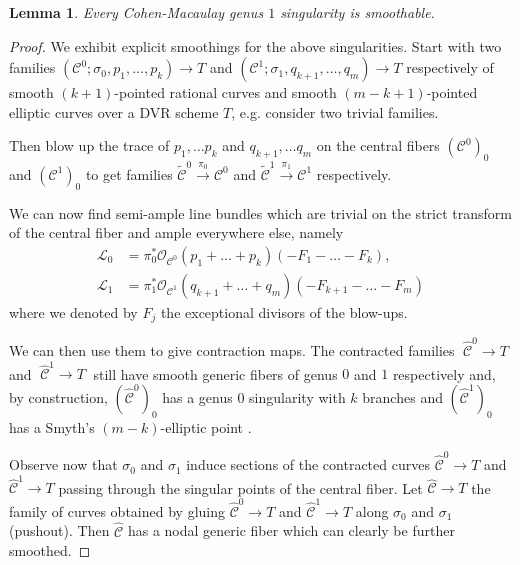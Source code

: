 \documentclass[11pt]{amsart}
\newcommand{\OO}{\mathcal O}
\renewcommand{\to}{\rightarrow}
\newcommand{\cC}{\mathcal C}
\theoremstyle{plain}
\newtheorem{lem}[thm]{Lemma}
\theoremstyle{definition}
\begin{document}
\begin{lem}
Every Cohen-Macaulay genus $1$ singularity is smoothable.
\end{lem}
\begin{proof}
We exhibit explicit smoothings for the above singularities.
Start with two families $(\cC^0;\sigma_0,p_1,\ldots,p_k)\to T$ and $(\cC^1;\sigma_1,q_{k+1},\ldots,q_m)\to T$ respectively of smooth $(k+1)$-pointed rational curves and smooth $(m-k+1)$-pointed elliptic curves over a DVR scheme $T$, e.g. consider two trivial families.

 Then blow up the trace of $p_1,\dots p_k$ and $q_{k+1},\dots q_{m}$ on the central fibers  $(\cC^0)_0$ and $(\cC^1)_0$ to get families $\widetilde{\cC}^0\xrightarrow{\pi_0} {\cC}^0$ and $\widetilde{\cC}^1\xrightarrow{\pi_1} {\cC}^1$ respectively.
 
We can now find semi-ample line bundles which are trivial on the strict transform of the central fiber and ample everywhere else, namely
\begin{align*}
\mathcal L_0&=\pi_0^*\OO_{\cC^0}(p_1+\ldots+ p_k)(-F_1-\ldots -F_k),\\
 \mathcal L_1&=\pi_1^*\OO_{\cC^1}(q_{k+1}+\ldots+ q_{m})(-F_{k+1}-\ldots -F_{m})
\end{align*}
where we denoted by $F_j$ the exceptional divisors of the blow-ups.

We can then use them to give contraction maps. The contracted families   $\;\hat{\cC}^0\to T\;$ and $\;\hat{\cC}^1\to T\;$ still have smooth generic fibers of genus $0$ and $1$ respectively and, by construction, $(\hat{\cC}^0)_0$ has a genus $0$ singularity with $k$ branches and $(\hat{\cC}^1)_0$ has a Smyth's $(m-k)$-elliptic point \cite[Lemma~2.12]{SMY1}.

Observe now that $\sigma_0$ and $\sigma_1$ induce sections of the contracted curves $\hat{\cC}^0\to T$ and $\hat{\cC}^1\to T$ passing through the singular points of the central fiber. Let $\hat{\cC}\to T$ the family of curves obtained by gluing $\hat{\cC}^0\to T$ and $\hat{\cC}^1\to T$ along $\sigma_0$ and $\sigma_1$ (pushout). Then $\hat{\cC}$ has a nodal generic fiber which can clearly be further smoothed.

\end{proof}
\end{document}
